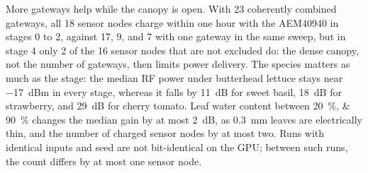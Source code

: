 More gateways help while the canopy is open. With 23 coherently combined gateways, all 18 sensor nodes charge within one hour with the AEM40940 in stages 0 to 2, against 17, 9, and 7 with one gateway in the same sweep, but in stage 4 only 2 of the 16 sensor nodes that are not excluded do: the dense canopy, not the number of gateways, then limits power delivery. The species matters as much as the stage: the median RF power under butterhead lettuce stays near \SI{-17}{dBm} in every stage, whereas it falls by \SI{11}{dB} for sweet basil, \SI{18}{dB} for strawberry, and \SI{29}{dB} for cherry tomato. Leaf water content between \SIlist{20;90}{\percent} changes the median gain by at most \SI{2}{dB}, as \SI{0.3}{mm} leaves are electrically thin, and the number of charged sensor nodes by at most two. Runs with identical inputs and seed are not bit-identical on the GPU; between such runs, the count differs by at most one sensor node.

